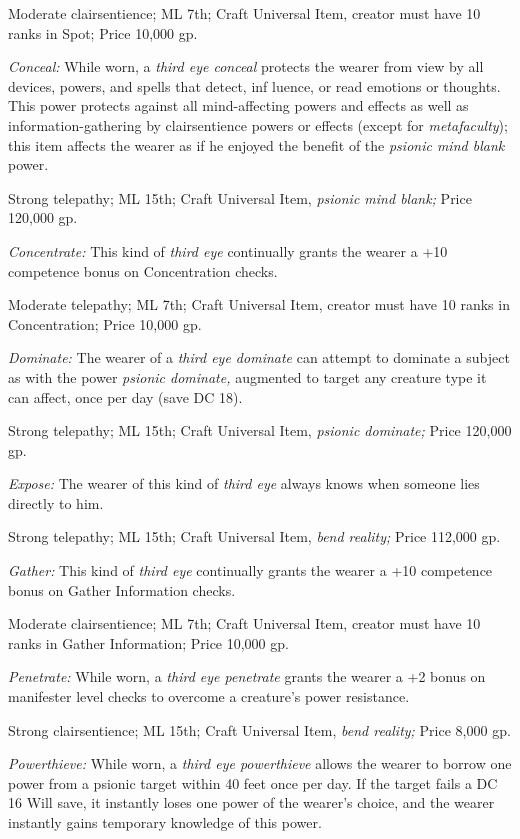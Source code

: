 \documentclass{article}
\begin{document}
Moderate clairsentience; ML 7th; Craft Universal Item, creator must have 10 ranks 
in Spot; Price 10,000 gp.

\textit{Conceal: }While worn, a \textit{third eye conceal }protects the wearer 
from view by all devices, powers, and spells that detect, inf luence, or read emotions 
or thoughts. This power protects against all mind-affecting powers and effects 
as well as information-gathering by clairsentience powers or effects (except for 
\textit{metafaculty}); this item affects the wearer as if he enjoyed the benefit 
of the \textit{psionic mind blank }power.

Strong telepathy; ML 15th; Craft Universal Item, \textit{psionic mind blank; }Price 
120,000 gp.

\textit{Concentrate: }This kind of \textit{third eye }continually grants the wearer 
a +10 competence bonus on Concentration checks. 

Moderate telepathy; ML 7th; Craft Universal Item, creator must have 10 ranks in 
Concentration; Price 10,000 gp.

\textit{Dominate: }The wearer of a \textit{third eye dominate }can attempt to dominate 
a subject as with the power \textit{psionic dominate, }augmented to target any 
creature type it can affect, once per day (save DC 18).

Strong telepathy; ML 15th; Craft Universal Item, \textit{psionic dominate; }Price 
120,000 gp.

\textit{Expose: }The wearer of this kind of \textit{third eye }always knows when 
someone lies directly to him.

Strong telepathy; ML 15th; Craft Universal Item, \textit{bend reality; }Price 112,000 
gp.

\textit{Gather: }This kind of \textit{third eye }continually grants the wearer 
a +10 competence bonus on Gather Information checks.

Moderate clairsentience; ML 7th; Craft Universal Item, creator must have 10 ranks 
in Gather Information; Price 10,000 gp.

\textit{Penetrate: }While worn, a \textit{third eye penetrate }grants the wearer 
a +2 bonus on manifester level checks to overcome a creature's power resistance.

Strong clairsentience; ML 15th; Craft Universal Item, \textit{bend reality; }Price 
8,000 gp.

\textit{Powerthieve: }While worn, a \textit{third eye powerthieve }allows the wearer 
to borrow one power from a psionic target within 40 feet once per day. If the target 
fails a DC 16 Will save, it instantly loses one power of the wearer's choice, and 
the wearer instantly gains temporary knowledge of this power.
\end{document}
